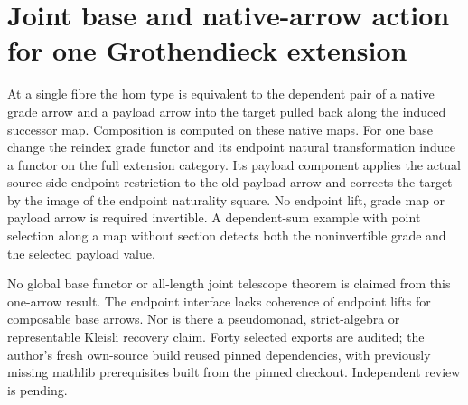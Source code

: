 \documentclass{article}
\begin{document}
\section*{Joint base and native-arrow action for one Grothendieck extension}
At a single fibre the hom type is equivalent to the dependent pair of a native grade arrow and a payload arrow into the target pulled back along the induced successor map. Composition is computed on these native maps. For one base change the reindex grade functor and its endpoint natural transformation induce a functor on the full extension category. Its payload component applies the actual source-side endpoint restriction to the old payload arrow and corrects the target by the image of the endpoint naturality square. No endpoint lift, grade map or payload arrow is required invertible. A dependent-sum example with point selection along a map without section detects both the noninvertible grade and the selected payload value.

No global base functor or all-length joint telescope theorem is claimed from this one-arrow result. The endpoint interface lacks coherence of endpoint lifts for composable base arrows. Nor is there a pseudomonad, strict-algebra or representable Kleisli recovery claim. Forty selected exports are audited; the author’s fresh own-source build reused pinned dependencies, with previously missing mathlib prerequisites built from the pinned checkout. Independent review is pending.
\end{document}
